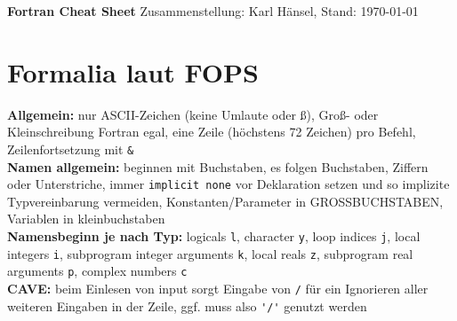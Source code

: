 \documentclass[a4paper, twocolumn]{scrarticle}
\begin{document}
{\Huge \textbf{\textsf{Fortran Cheat Sheet}}}
Zusammenstellung: Karl Hänsel, Stand: \today

\section{Formalia laut FOPS}
\textbf{Allgemein:} nur ASCII-Zeichen (keine Umlaute oder ß), Groß- oder Kleinschreibung Fortran egal, eine Zeile (höchstens 72 Zeichen) pro Befehl, Zeilenfortsetzung mit \lstinline|&|\\
\textbf{ Namen allgemein:} beginnen mit Buchstaben, es folgen Buchstaben, Ziffern oder Unterstriche, immer \lstinline|implicit none| vor Deklaration setzen und so implizite Typvereinbarung vermeiden, Konstanten/Parameter in GROSSBUCHSTABEN, Variablen in kleinbuchstaben\\
\textbf{Namensbeginn je nach Typ:} logicals \lstinline|l|, character \lstinline|y|, loop indices \lstinline|j|, local integers \lstinline|i|, subprogram integer arguments \lstinline|k|, local reals \lstinline|z|, subprogram real arguments \lstinline|p|, complex numbers \lstinline|c|\\
\textbf{CAVE:} beim Einlesen von input sorgt Eingabe von \lstinline|/| für ein Ignorieren aller weiteren Eingaben in der Zeile, ggf. muss also \lstinline|'/'| genutzt werden
\end{document}
